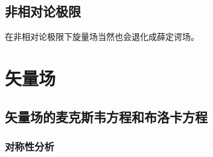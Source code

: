 \documentclass[hyperref, UTF8, a4paper]{ctexart}
\begin{document}
\subsection{非相对论极限}

在非相对论极限下旋量场当然也会退化成薛定谔场。

\section{矢量场}


\subsection{矢量场的麦克斯韦方程和布洛卡方程}

\subsubsection{对称性分析}
\end{document}
